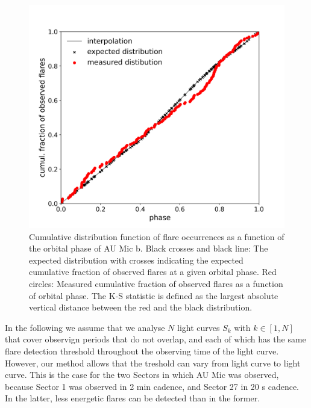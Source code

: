 \documentclass[fleqn,usenatbib,letters]{mnras}%
\begin{document}
\begin{figure}
\includegraphics[width=\hsize]{figures/2021_06_08_AUMic_KS_Test_cumdist_total_Both_Sectors_Orbit.png} 
\caption{Cumulative distribution function of flare occurrences as a function of the orbital phase of AU Mic b. Black crosses and black line: The expected distribution with crosses indicating the expected cumulative fraction of observed flares at a given orbital phase. Red circles: Measured cumulative fraction of observed flares as a function of orbital phase. The K-S statistic is defined as the largest absolute vertical distance between the red and the black distribution.}
\label{fig:cumdist}
\end{figure}


In the following we assume that we analyse $N$ light curves $S_k$ with $k\in [1,N]$ that cover observign periods that do not overlap, and each of which has the same flare detection threshold throughout the observing time of the light curve. However, our method allows that the treshold can vary from light curve to light curve. This is the case for the two Sectors in which AU Mic was observed, because Sector 1 was observed in 2 min cadence, and Sector 27 in 20 s cadence. In the latter, less energetic flares can be detected than in the former.
\end{document}
